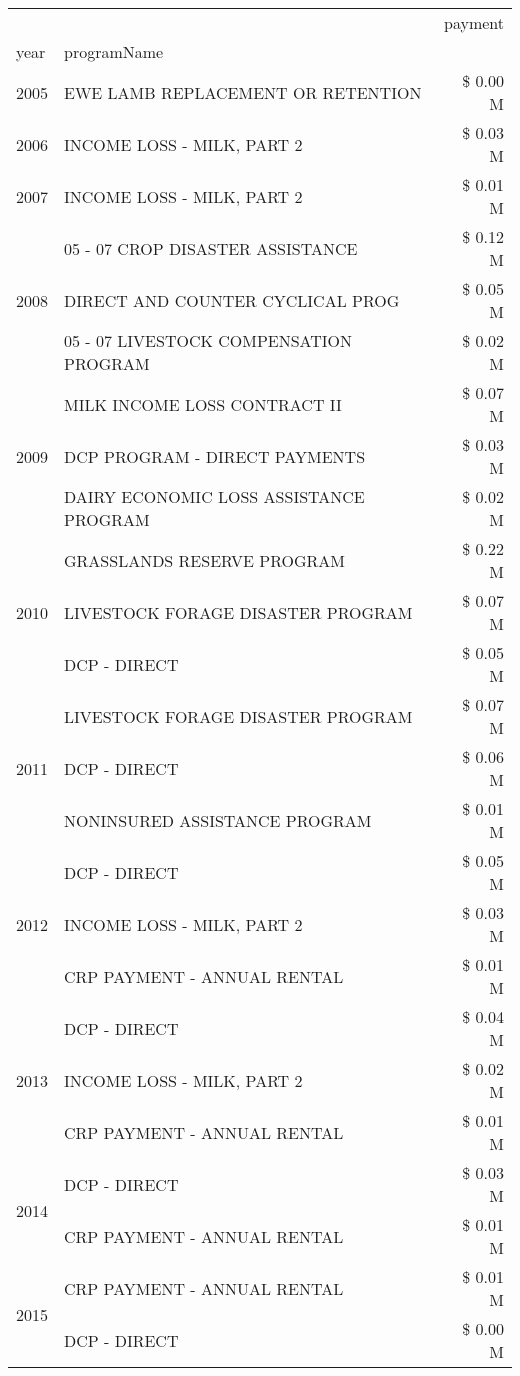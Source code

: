 \begin{tabular}{llr}
\toprule
 &  & payment \\
year & programName &  \\
\midrule
2005 & EWE LAMB REPLACEMENT OR RETENTION & \$ 0.00 M \\
\cline{1-3}
2006 & INCOME LOSS - MILK, PART 2 & \$ 0.03 M \\
\cline{1-3}
2007 & INCOME LOSS - MILK, PART 2 & \$ 0.01 M \\
\cline{1-3}
\multirow[t]{3}{*}{2008} & 05 - 07 CROP DISASTER ASSISTANCE & \$ 0.12 M \\
 & DIRECT AND COUNTER CYCLICAL PROG & \$ 0.05 M \\
 & 05 - 07 LIVESTOCK COMPENSATION PROGRAM & \$ 0.02 M \\
\cline{1-3}
\multirow[t]{3}{*}{2009} & MILK INCOME LOSS CONTRACT II & \$ 0.07 M \\
 & DCP PROGRAM - DIRECT PAYMENTS & \$ 0.03 M \\
 & DAIRY ECONOMIC LOSS ASSISTANCE PROGRAM & \$ 0.02 M \\
\cline{1-3}
\multirow[t]{3}{*}{2010} & GRASSLANDS RESERVE PROGRAM & \$ 0.22 M \\
 & LIVESTOCK FORAGE DISASTER PROGRAM & \$ 0.07 M \\
 & DCP - DIRECT & \$ 0.05 M \\
\cline{1-3}
\multirow[t]{3}{*}{2011} & LIVESTOCK FORAGE DISASTER PROGRAM & \$ 0.07 M \\
 & DCP - DIRECT & \$ 0.06 M \\
 & NONINSURED ASSISTANCE PROGRAM & \$ 0.01 M \\
\cline{1-3}
\multirow[t]{3}{*}{2012} & DCP - DIRECT & \$ 0.05 M \\
 & INCOME LOSS - MILK, PART 2 & \$ 0.03 M \\
 & CRP PAYMENT - ANNUAL RENTAL & \$ 0.01 M \\
\cline{1-3}
\multirow[t]{3}{*}{2013} & DCP - DIRECT & \$ 0.04 M \\
 & INCOME LOSS - MILK, PART 2 & \$ 0.02 M \\
 & CRP PAYMENT - ANNUAL RENTAL & \$ 0.01 M \\
\cline{1-3}
\multirow[t]{2}{*}{2014} & DCP - DIRECT & \$ 0.03 M \\
 & CRP PAYMENT - ANNUAL RENTAL & \$ 0.01 M \\
\cline{1-3}
\multirow[t]{3}{*}{2015} & CRP PAYMENT - ANNUAL RENTAL & \$ 0.01 M \\
 & DCP - DIRECT & \$ 0.00 M \\

\end{tabular}
